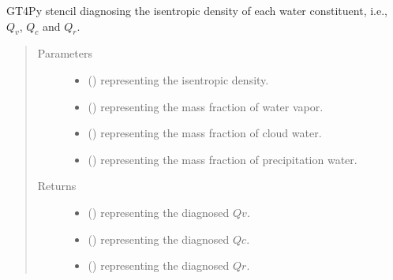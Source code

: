\documentclass[letterpaper,10pt,english]{sphinxmanual}
\begin{document}
\begin{fulllineitems}
\begin{fulllineitems}
\label{\detokenize{api:tasmania.dycore.diagnostic_isentropic.DiagnosticIsentropic._stencil_diagnosing_water_constituents_isentropic_density_defs}}
GT4Py stencil diagnosing the isentropic density of each water constituent, i.e.,
\(Q_v\), \(Q_c\) and \(Q_r\).
\begin{quote}\begin{description}
\item[{Parameters}] \leavevmode\begin{itemize}
\item {} 
 () \textendash{}  representing the isentropic density.

\item {} 
 () \textendash{}  representing the mass fraction of water vapor.

\item {} 
 () \textendash{}  representing the mass fraction of cloud water.

\item {} 
 () \textendash{}  representing the mass fraction of precipitation water.

\end{itemize}

\item[{Returns}] \leavevmode
\begin{itemize}
\item {} 
 () \textendash{}  representing the diagnosed \(Qv\).

\item {} 
 () \textendash{}  representing the diagnosed \(Qc\).

\item {} 
 () \textendash{}  representing the diagnosed \(Qr\).


\end{itemize}
\end{description}
\end{quote}
\end{fulllineitems}
\end{fulllineitems}
\end{document}
